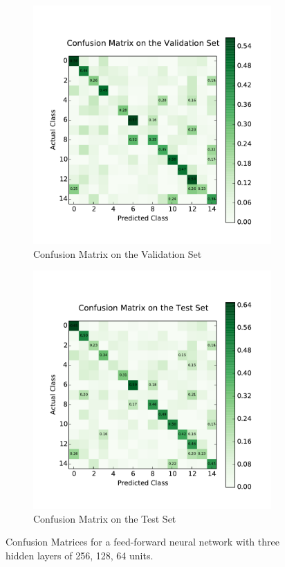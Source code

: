 \begin{figure}
	\centering
	\begin{subfigure}[b]{0.45\linewidth}
		\centering
		\includegraphics[width=\linewidth]{images/2/cm_valid.pdf}
		\caption{Confusion Matrix on the Validation Set}
	\end{subfigure}
	\hfill
	\begin{subfigure}[b]{0.45\linewidth}
		\centering
		\includegraphics[width=\linewidth]{images/2/cm_test.pdf}
		\caption{Confusion Matrix on the Test Set}
	\end{subfigure}
	\caption{Confusion Matrices for a feed-forward neural network with three hidden layers of 256, 128, 64 units.}
	\label{shrine0_mat}
\end{figure}
